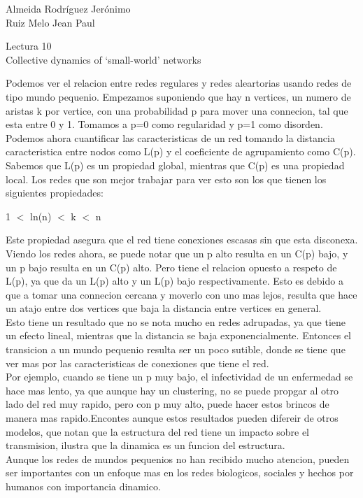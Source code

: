 \documentclass[a4paper, 12pt]{report}
\begin{document}
\begin{flushright}
    Almeida Rodríguez Jerónimo\\
    Ruiz Melo Jean Paul
\end{flushright}

\begin{center}
    {\LARGE Lectura 10}\\
    {\LARGE Collective dynamics of ‘small-world’ networks}
\end{center}
Podemos ver el relacion entre redes regulares y redes aleartorias usando redes de 
tipo mundo pequenio. Empezamos suponiendo que hay n vertices, un numero de aristas 
k por vertice, con una probabilidad p para mover una connecion, tal que esta entre
0 y 1. Tomamos a p=0 como regularidad y p=1 como disorden. \\

Podemos ahora cuantificar las caracteristicas de un red tomando la distancia 
caracteristica entre nodos como L(p) y el coeficiente de agrupamiento como C(p).
Sabemos que L(p) es un propiedad global, mientras que C(p) es una propiedad local.
Los redes que son mejor trabajar para ver esto son los que tienen los siguientes 
propiedades:
\begin{center}
    1 $<$ ln(n) $<$ k $<$ n
\end{center}
Este propiedad asegura que el red tiene conexiones escasas sin que esta disconexa.
Viendo los redes ahora, se puede notar que un p alto resulta en un C(p) bajo, y un
p bajo resulta en un C(p) alto. Pero tiene el relacion opuesto a respeto de L(p), 
ya que da un L(p) alto y un L(p) bajo respectivamente. Esto es debido a que a tomar
una connecion cercana y moverlo con uno mas lejos, resulta que hace un atajo entre 
dos vertices que baja la distancia entre vertices en general.  \\

Esto tiene un resultado que no se nota mucho en redes adrupadas, ya que tiene un 
efecto lineal, mientras que la distancia se baja exponencialmente. Entonces el 
transicion a un mundo pequenio resulta ser un poco sutible, donde se tiene que 
ver mas por las caracteristicas de conexiones que tiene el red.\\

Por ejemplo, cuando se tiene un p muy bajo, el infectividad de un enfermedad se 
hace mas lento, ya que aunque hay un clustering, no se puede propgar al otro 
lado del red muy rapido, pero con p muy alto, puede hacer estos brincos de manera
mas rapido.Encontes aunque estos resultados pueden difereir de otros modelos, que
notan que la estructura del red tiene un impacto sobre el transmision, ilustra 
que la dinamica es un funcion del estructura. \\

Aunque los redes de mundos pequenios no han recibido mucho atencion, pueden ser
importantes con un enfoque mas en los redes biologicos, sociales y hechos por 
humanos con importancia dinamico.
\end{document}
